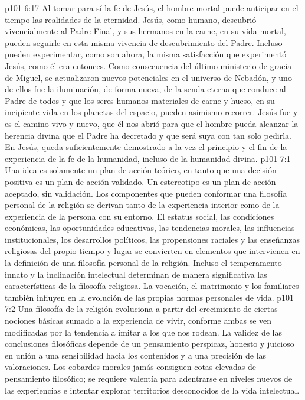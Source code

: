 \vs p101 6:17 Al tomar para sí la fe de Jesús, el hombre mortal puede anticipar en el tiempo las realidades de la eternidad. Jesús, como humano, descubrió vivencialmente al Padre Final, y sus hermanos en la carne, en su vida mortal, pueden seguirle en esta misma vivencia de descubrimiento del Padre. Incluso pueden experimentar, como son ahora, la misma satisfacción que experimentó Jesús, como él era entonces. Como consecuencia del último ministerio de gracia de Miguel, se actualizaron nuevos potenciales en el universo de Nebadón, y uno de ellos fue la iluminación, de forma nueva, de la senda eterna que conduce al Padre de todos y que los seres humanos materiales de carne y hueso, en su incipiente vida en los planetas del espacio, pueden asimismo recorrer. Jesús fue y es el camino vivo y nuevo, que él nos abrió para que el hombre pueda alcanzar la herencia divina que el Padre ha decretado y que será suya con tan solo pedirla. En Jesús, queda suficientemente demostrado a la vez el principio y el fin de la experiencia de la fe de la humanidad, incluso de la humanidad divina.
\vs p101 7:1 Una idea es solamente un plan de acción teórico, en tanto que una decisión positiva es un plan de acción validado. Un estereotipo es un plan de acción aceptado, sin validación. Los componentes que pueden conformar una filosofía personal de la religión se derivan tanto de la experiencia interior como de la experiencia de la persona con su entorno. El estatus social, las condiciones económicas, las oportunidades educativas, las tendencias morales, las influencias institucionales, los desarrollos políticos, las propensiones raciales y las enseñanzas religiosas del propio tiempo y lugar se convierten en elementos que intervienen en la definición de una filosofía personal de la religión. Incluso el temperamento innato y la inclinación intelectual determinan de manera significativa las características de la filosofía religiosa. La vocación, el matrimonio y los familiares también influyen en la evolución de las propias normas personales de vida.
\vs p101 7:2 Una filosofía de la religión evoluciona a partir del crecimiento de ciertas nociones básicas sumado a la experiencia de vivir, conforme ambas se ven modificadas por la tendencia a imitar a los que nos rodean. La validez de las conclusiones filosóficas depende de un pensamiento perspicaz, honesto y juicioso en unión a una sensibilidad hacia los contenidos y a una precisión de las valoraciones. Los cobardes morales jamás consiguen cotas elevadas de pensamiento filosófico; se requiere valentía para adentrarse en niveles nuevos de las experiencias e intentar explorar territorios desconocidos de la vida intelectual.
